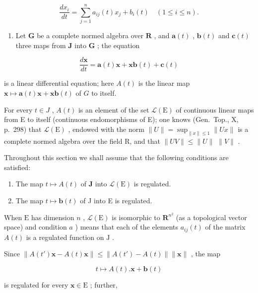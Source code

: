 \[
\frac {d x _ {i}}{d t} = \sum_ {j = 1} ^ {n} a _ {i j} (t) x _ {j} + b _ {i} (t) \quad (1 \leqslant i \leqslant n).\tag{3}
\]

\begin{enumerate}
\def\labelenumi{\arabic{enumi})}
\setcounter{enumi}{1}
\tightlist
\item
  Let \(\mathbf{G}\) be a complete normed algebra over \(\mathbf{R}\) , and \(\mathbf{a}(t)\) , \(\mathbf{b}(t)\) and \(\mathbf{c}(t)\) three maps from \(\mathbf{J}\) into \(\mathbf{G}\) ; the equation
\end{enumerate}

\[
\frac {d \mathbf {x}}{d t} = \mathbf {a} (t) \mathbf {x} + \mathbf {x b} (t) + \mathbf {c} (t)
\]

is a linear differential equation; here \(A(t)\) is the linear map \(\mathbf{x} \mapsto \mathbf{a}(t)\mathbf{x} + \mathbf{x}\mathbf{b}(t)\) of \(G\) to itself.

For every \(t \in J\) , \(A(t)\) is an element of the set \(\mathcal{L}(\mathrm{E})\) of continuous linear maps from E to itself (continuous endomorphisms of E); one knows (Gen.~Top., X, p.~298) that \(\mathcal{L}(\mathrm{E})\) , endowed with the norm \(\|U\| = \sup_{\|x\| \leqslant 1} \|Ux\|\) is a complete normed algebra over the field R, and that \(\|UV\| \leqslant \|U\|\) \(\|V\|\) .

Throughout this section we shall assume that the following conditions are satisfied:

\begin{enumerate}
\def\labelenumi{\alph{enumi})}
\item
  The map \(t \mapsto A(t)\) of \(\mathbf{J}\) into \(\mathcal{L}(\mathrm{E})\) is regulated.
\item
  The map \(t \mapsto \mathbf{b}(t)\) of J into E is regulated.
\end{enumerate}

When \(\mathrm{E}\) has dimension \(n\) , \(\mathcal{L}(\mathrm{E})\) is isomorphic to \(\mathbf{R}^{n^2}\) (as a topological vector space) and condition \(a\) ) means that each of the elements \(a_{ij}(t)\) of the matrix \(A(t)\) is a regulated function on \(\mathrm{J}\) .

Since \(\left\| A(t')\mathbf{x} - A(t)\mathbf{x}\right\| \leqslant \left\| A(t') - A(t)\right\| \| \mathbf{x}\|\) , the map

\[
t \mapsto A (t). \mathbf {x} + \mathbf {b} (t)
\]

is regulated for every \(\mathbf{x} \in \mathrm{E}\) ; further,


